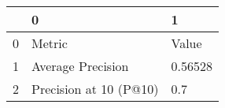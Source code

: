\begin{tabular}{lll}
\toprule
{} &                       0 &        1 \\
\midrule
0 &                  Metric &    Value \\
1 &       Average Precision &  0.56528 \\
2 &  Precision at 10 (P@10) &      0.7 \\
\bottomrule
\end{tabular}
